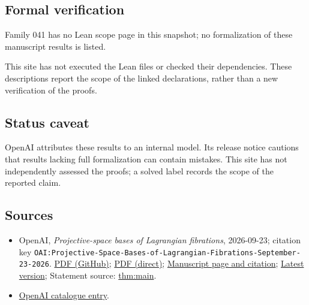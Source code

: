 \documentclass[11pt]{article}
\begin{document}
\subsection{Formal verification}
Family 041 has no Lean scope page in this snapshot; no formalization of these manuscript results is listed.

This site has not executed the Lean files or checked their dependencies. These descriptions report the scope of the linked declarations, rather than a new verification of the proofs.

\subsection{Status caveat}
OpenAI attributes these results to an internal model. Its release notice cautions that results lacking full formalization can contain mistakes. This site has not independently assessed the proofs; a solved label records the scope of the reported claim.

\subsection{Sources}
\begin{itemize}
\item OpenAI, \emph{Projective-space bases of Lagrangian fibrations}, 2026-09-23; citation key \texttt{OAI:Projective-Space-Bases-of-Lagrangian-Fibrations-September-23-2026}. \href{https://github.com/openai/math/blob/adc7f1241b42e322a6451854ab7e4b4c146bf78a/preprints/Projective-Space-Bases-of-Lagrangian-Fibrations-September-23-2026/main.pdf}{PDF (GitHub)}; \href{https://github.com/openai/math/raw/adc7f1241b42e322a6451854ab7e4b4c146bf78a/preprints/Projective-Space-Bases-of-Lagrangian-Fibrations-September-23-2026/main.pdf}{PDF (direct)}; \href{https://github.com/openai/math/blob/adc7f1241b42e322a6451854ab7e4b4c146bf78a/preprints/Projective-Space-Bases-of-Lagrangian-Fibrations-September-23-2026/README.md}{Manuscript page and citation}; \href{https://github.com/openai/math/blob/main/preprints/Projective-Space-Bases-of-Lagrangian-Fibrations-September-23-2026/main.pdf}{Latest version}; Statement source: \href{https://github.com/openai/math/blob/adc7f1241b42e322a6451854ab7e4b4c146bf78a/preprints/Projective-Space-Bases-of-Lagrangian-Fibrations-September-23-2026/build/source/sections/01-introduction.tex\#L59}{thm:main}.
\item \href{https://github.com/openai/math/blob/adc7f1241b42e322a6451854ab7e4b4c146bf78a/CONTENTS.md}{OpenAI catalogue entry}.
\end{itemize}
\end{document}
